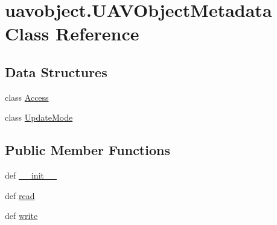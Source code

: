 \hypertarget{classuavobject_1_1_u_a_v_object_metadata}{\section{uavobject.\-U\-A\-V\-Object\-Metadata \-Class \-Reference}
\label{classuavobject_1_1_u_a_v_object_metadata}
}
\subsection*{\-Data \-Structures}
\begin{DoxyCompactItemize}
\item 
class \hyperlink{classuavobject_1_1_u_a_v_object_metadata_1_1_access}{\-Access}
\item 
class \hyperlink{classuavobject_1_1_u_a_v_object_metadata_1_1_update_mode}{\-Update\-Mode}
\end{DoxyCompactItemize}
\subsection*{\-Public \-Member \-Functions}
\begin{DoxyCompactItemize}
\item 
def \hyperlink{classuavobject_1_1_u_a_v_object_metadata_a624d80159a14066c74c6e3f42d53cea1}{\-\_\-\-\_\-init\-\_\-\-\_\-}
\item 
def \hyperlink{classuavobject_1_1_u_a_v_object_metadata_a2279efe9c99e6c87c29b3263397dcb78}{read}
\item 
def \hyperlink{classuavobject_1_1_u_a_v_object_metadata_ab27321a3eaf48b6877348877c6aeed96}{write}
\end{DoxyCompactItemize}
